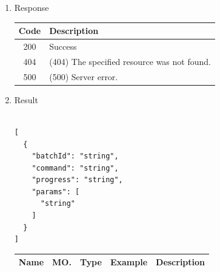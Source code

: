 \begin{enumerate}
\begin{enumerate}
\begin{table}[H]
\begin{center}
\begin{tabular}{|p{3cm}|l|p{3cm}|p{3cm}|p{4cm}|}
\end{tabular}
\end{center}
\end{table}


\item REST Method

\begin{tcolorbox}[boxrule=0pt, frame empty]
\begin{verbatim} 

GET /activity/{activityId}/command

\end{verbatim}
\end{tcolorbox}

\end{enumerate}

\item Response

\begin{table}[H]
\footnotesize

\begin{center}
\begin{tabular}{|c|l|} 
\hline
\rowcolor{lightgray}	Code 		& 	Description \\
\hline
200	 		&	Success \\
\hline
404			&	(404) The specified resource was not found. \\
\hline
500			&	(500) Server error. \\
\hline
\end{tabular}
\end{center}
\end{table}

\item Result

\begin{tcolorbox}[boxrule=0pt, frame empty]
\begin{verbatim}

[
  {
    "batchId": "string",
    "command": "string",
    "progress": "string",
    "params": [
      "string"
    ]
  }
]

\end{verbatim}
\end{tcolorbox}

\begin{table}[H]
\footnotesize
\begin{center}
\begin{tabular}{|p{3cm}|l|p{3cm}|p{3cm}|p{4cm}|} 
\hline
\rowcolor{lightgray}	Name	& MO.	& Type	& Example & 	Description \\
\hline


\end{tabular}
\end{center}
\end{table}
\end{enumerate}
